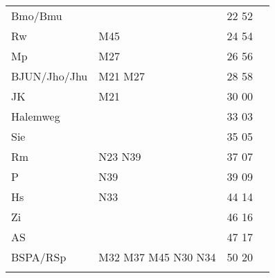 \begin{tabular}{!{\color{schiefergrau}\vrule width 3pt}*{4}{l!{\color{schiefergrau}\vrule width 3pt}}}
Bmo/Bmu      & \nuzwei{}                                   & 22 52 &       \\
Rw           & \mbus{} M45                                 & 24 54 &       \\
Mp           & \mbus{} M27                                 & 26 56 &       \\
BJUN/Jho/Jhu & \mbus{} M21 M27                             & 28 58 &       \\
JK           & \mbus{} M21                                 & 30 00 &       \\
Halemweg     &                                             & 33 03 &       \\
Sie          &                                             & 35 05 &       \\
Rm           & \nbus{} N23 N39                             & 37 07 &       \\
P            & \nbus{} N39                                 & 39 09 &       \\
Hs           & \nbus{} N33                                 & 44 14 &       \\
Zi           &                                             & 46 16 &       \\
AS           &                                             & 47 17 &       \\
BSPA/RSp     & \mbus{} M32 M37 M45 \nbus{} N30 N34         & 50 20 &       \\
\myhline
\end{tabular}
